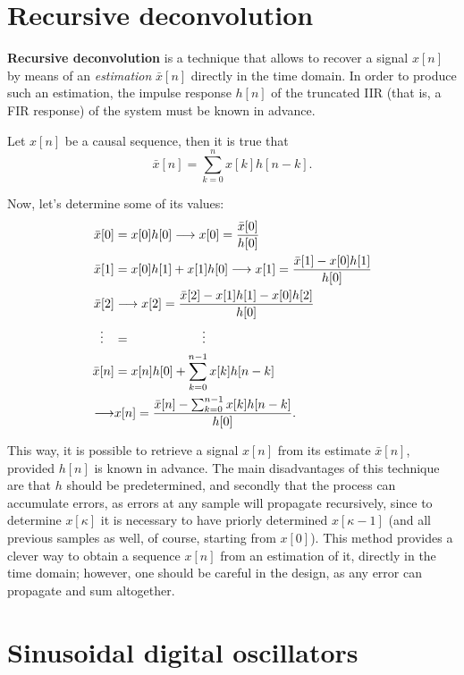 \documentclass[\documentfontsize, twocolumn]{\classname}
\begin{document}
\section{Recursive deconvolution}

\textbf{Recursive deconvolution} is a technique that allows to recover a signal $x[n]$ by means of an \emph{estimation} $\bar{x}[n]$ directly in the time domain. In order to produce such an estimation, the impulse response $h[n]$ of the truncated IIR (that is, a FIR response) of the system must be known in advance.

Let $x[n]$ be a causal sequence, then it is true that
\[
    \bar{x}[n] = \sum_{k=0}^n x[k]h[n-k].
\]

Now, let's determine some of its values:
\begin{align*}
    \bar{x}[0] &= x[0]h[0] \longrightarrow x[0] = \frac{\bar{x}[0]}{h[0]}\\
    \bar{x}[1] &= x[0]h[1] + x[1]h[0] \longrightarrow x[1] = \frac{\bar{x}[1] - x[0]h[1]}{h[0]}\\
    \bar{x}[2] &\longrightarrow x[2] = \frac{\bar{x}[2] - x[1]h[1] - x[0]h[2]}{h[0]}\\
    \vdots \hspace{.3cm}     &= \hspace{2cm} \vdots\\
    \bar{x}[n] &= x[n]h[0] + \sum_{k=0}^{n-1}x[k]h[n-k]\\ 
    \longrightarrow & x[n] = \frac{\bar{x}[n] - \sum_{k=0}^{n-1}x[k]h[n-k]}{h[0]}.\\
\end{align*}

This way, it is possible to retrieve a signal $x[n]$ from its estimate $\bar{x}[n]$, provided $h[n]$ is known in advance. The main disadvantages of this technique are that $h$ should be predetermined, and secondly that the process can accumulate errors, as errors at any sample will propagate recursively, since to determine $x[\kappa]$ it is necessary to have priorly determined $x[\kappa - 1]$ (and all previous samples as well, of course, starting from $x[0]$). This method provides a clever way to obtain a sequence $x[n]$ from an estimation of it, directly in the time domain; however, one should be careful in the design, as any error can propagate and sum altogether.

\section{Sinusoidal digital oscillators}
\end{document}
